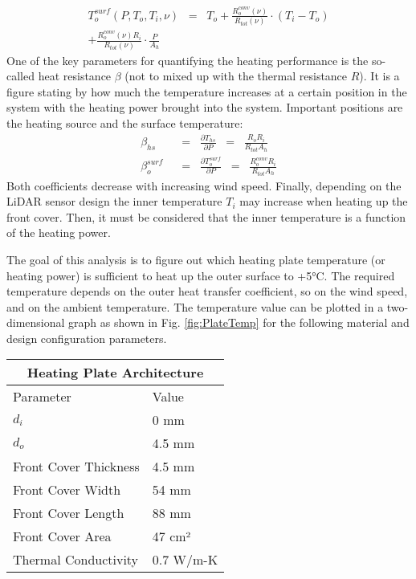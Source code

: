 \begin{multline}
T_o^{surf}(P,T_o,T_i,\nu) \;\; = \;\; T_o + \frac{R_o^{conv}(\nu)}{R_{tot}(\nu)}\cdot (T_i - T_o) \\
+ \frac{R_o^{conv}(\nu)R_i}{R_{tot}(\nu)}\cdot \frac{P}{A_h}
\end{multline}
One of the key parameters for quantifying the heating performance is the so-called heat resistance \(\beta\) (not to mixed up with the thermal resistance \(R\)). It is a figure stating by how much the temperature increases at a certain position in the system with the heating power brought into the system. Important positions are the heating source and the surface temperature:
\begin{align}
\beta_{hs} \;\; &= \;\; \frac{\partial T_{hs}}{\partial P} \;\; = \;\; \frac{R_oR_i}{R_{tot}A_h} \\
\beta_o^{surf} \;\; &= \;\; \frac{\partial T_o^{surf}}{\partial P} \;\; = \;\; \frac{R_o^{conv}R_i}{R_{tot}A_h}
\end{align}
Both coefficients decrease with increasing wind speed. Finally, depending on the LiDAR sensor design the inner temperature \(T_i\) may increase when heating up the front cover. Then, it must be considered that the inner temperature is a function of the heating power. 

The goal of this analysis is to figure out which heating plate temperature (or heating power) is sufficient to heat up the outer surface to +5°C. The required temperature depends on the outer heat transfer coefficient, so on the wind speed, and on the ambient temperature. The temperature value can be plotted in a two-dimensional graph as shown in Fig. \ref{fig:PlateTemp} for the following material and design configuration parameters. 
\begin{center}
\begin{tabular}{||l l||} 
 \hline
 \multicolumn{2}{|c|}{Heating Plate Architecture} \\
 \hline\hline
 Parameter & Value\\
 \hline\hline
 \(d_i\) & 0 mm  \\ 
 \hline
 \(d_o\) & 4.5 mm  \\ 
 \hline
 Front Cover Thickness & 4.5 mm \\
 \hline
 Front Cover Width & 54 mm  \\ 
 \hline
 Front Cover Length & 88 mm \\
 \hline
 Front Cover Area & 47 cm²  \\
 \hline
 Thermal Conductivity & 0.7 W/m-K \\ [1ex] 
 \hline
\end{tabular}
\end{center}


